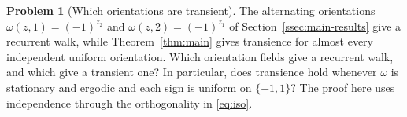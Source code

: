 \documentclass[11pt]{amsart}
\theoremstyle{plain}
\theoremstyle{definition}
\newtheorem{problem}{Problem}
\newcommand{\1}{\mathbf 1}
\begin{document}
\begin{problem}[Which orientations are transient]\label{prob:which}
The alternating orientations $\omega(z,1)=(-1)^{z_2}$ and
$\omega(z,2)=(-1)^{z_1}$ of Section~\ref{ssec:main-results} give a recurrent
walk, while
Theorem~\ref{thm:main} gives transience for almost every independent uniform
orientation.  Which orientation fields give a recurrent walk, and which
give a transient one?  In particular, does transience hold whenever
$\omega$ is stationary and ergodic and each sign is uniform on
$\{-1,1\}$?  The proof here uses independence through the orthogonality in
\eqref{eq:iso}.
\end{problem}



\end{document}
